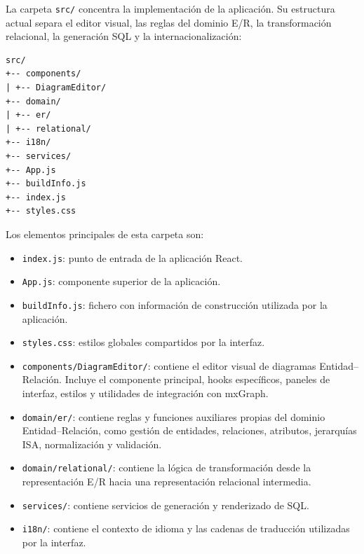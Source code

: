 La carpeta \texttt{src/} concentra la implementación de la aplicación. Su estructura actual separa el editor visual, las reglas del dominio E/R, la transformación relacional, la generación SQL y la internacionalización:

\begin{verbatim}
src/
+-- components/
| +-- DiagramEditor/
+-- domain/
| +-- er/
| +-- relational/
+-- i18n/
+-- services/
+-- App.js
+-- buildInfo.js
+-- index.js
+-- styles.css
\end{verbatim}

Los elementos principales de esta carpeta son:

\begin{itemize}
\item \texttt{index.js}: punto de entrada de la aplicación React.

\item \texttt{App.js}: componente superior de la aplicación.

\item \texttt{buildInfo.js}: fichero con información de construcción utilizada por la aplicación.

\item \texttt{styles.css}: estilos globales compartidos por la interfaz.

\item \texttt{components/DiagramEditor/}: contiene el editor visual de diagramas Entidad--Relación. Incluye el componente principal, hooks específicos, paneles de interfaz, estilos y utilidades de integración con mxGraph.

\item \texttt{domain/er/}: contiene reglas y funciones auxiliares propias del dominio Entidad--Relación, como gestión de entidades, relaciones, atributos, jerarquías ISA, normalización y validación.

\item \texttt{domain/relational/}: contiene la lógica de transformación desde la representación E/R hacia una representación relacional intermedia.

\item \texttt{services/}: contiene servicios de generación y renderizado de SQL.

\item \texttt{i18n/}: contiene el contexto de idioma y las cadenas de traducción utilizadas por la interfaz.

\end{itemize}

